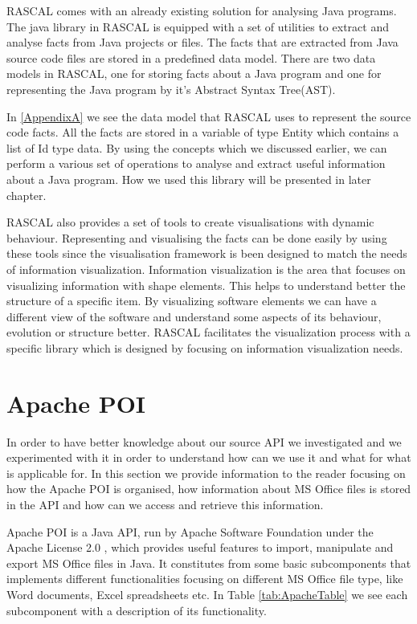 RASCAL comes with an already existing solution for analysing Java programs. The java library in RASCAL is equipped with a set of utilities to extract and analyse facts from Java projects or files. The facts that are extracted from Java source code files are stored in a predefined data model. There are two data models in RASCAL, one for storing facts about a Java program and one for representing the Java program by it's Abstract Syntax Tree(AST).

In \ref{AppendixA} we see the data model that RASCAL uses to represent the source code facts. All the facts are stored in a variable of type Entity which contains a list of Id type data. By using the concepts which we discussed earlier, we can perform a various set of operations to analyse and extract useful information about a Java program. How we used this library will be presented in later chapter.

RASCAL also provides a set of tools to create visualisations with dynamic behaviour. Representing and visualising the facts can be done easily by using these tools since the visualisation framework is been designed to match the needs of information visualization. Information visualization is the area that focuses on visualizing information with shape elements. This helps to understand better the structure of a specific item. By visualizing software elements we can have a different view of the software and understand some aspects of its behaviour, evolution or structure better\cite{visualization}. RASCAL facilitates the visualization process with a specific library which is designed by focusing on information visualization needs.


\section{Apache POI}

In order to have better knowledge about our source API we investigated and we experimented with it in order to understand how can we use it and what for what is applicable for. In this section we provide information to the reader focusing on how the Apache POI is organised, how information about MS Office files is stored in the API and how can we access and retrieve this information.

Apache POI \cite{POI} is a Java API, run by Apache Software Foundation under the Apache License 2.0 \cite{POILIC}, which provides useful features to import, manipulate and export MS Office files in Java. It constitutes from some basic subcomponents that implements different functionalities focusing on different MS Office file type, like Word documents, Excel spreadsheets etc. In Table \ref{tab:ApacheTable} we see each subcomponent with a description of its functionality.

